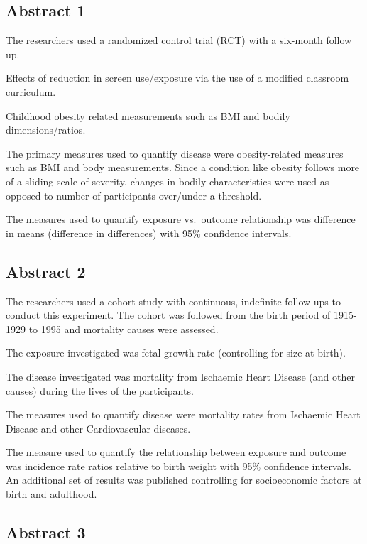 \documentclass[
]{article}
\begin{document}
\subsection{Abstract 1}\label{abstract-1}

The researchers used a randomized control trial (RCT) with a six-month
follow up.

Effects of reduction in screen use/exposure via the use of a modified
classroom curriculum.

Childhood obesity related measurements such as BMI and bodily
dimensions/ratios.

The primary measures used to quantify disease were obesity-related
measures such as BMI and body measurements. Since a condition like
obesity follows more of a sliding scale of severity, changes in bodily
characteristics were used as opposed to number of participants
over/under a threshold.

The measures used to quantify exposure vs.~outcome relationship was
difference in means (difference in differences) with 95\% confidence
intervals.

\subsection{Abstract 2}\label{abstract-2}

The researchers used a cohort study with continuous, indefinite follow
ups to conduct this experiment. The cohort was followed from the birth
period of 1915-1929 to 1995 and mortality causes were assessed.

The exposure investigated was fetal growth rate (controlling for size at
birth).

The disease investigated was mortality from Ischaemic Heart Disease (and
other causes) during the lives of the participants.

The measures used to quantify disease were mortality rates from
Ischaemic Heart Disease and other Cardiovascular diseases.

The measure used to quantify the relationship between exposure and
outcome was incidence rate ratios relative to birth weight with 95\%
confidence intervals. An additional set of results was published
controlling for socioeconomic factors at birth and adulthood.

\subsection{Abstract 3}\label{abstract-3}
\end{document}
